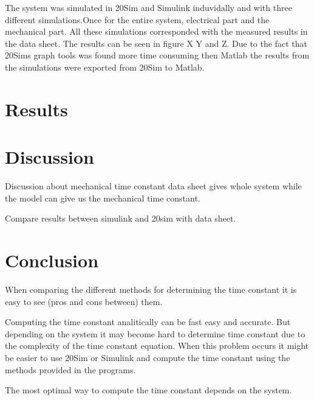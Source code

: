 \documentclass[12pt,a4paper]{article}
\begin{document}
The system was simulated in 20Sim and Simulink induvidally and with three different simulations.Once for the entire system, electrical part and the mechanical part. All these simulations corresponded with the measured results in the data sheet. The results can be seen in figure X Y and Z. Due to the fact that 20Sims graph tools was found more time consuming then Matlab the results from the simulations were exported from 20Sim to Matlab.
\section{Results}


\section{Discussion}
Discussion about mechanical time constant data sheet gives whole system while the model can give us the mechanical time constant.

Compare results between simulink and 20sim with data sheet.
\lipsum[4]

\section{Conclusion}
When comparing the different methods for determining the time constant it is easy to see (pros and cons between) them. 

Computing the time constant analitically can be fast easy and accurate. But depending on the system it may become hard to determine time constant due to the complexity of the time constant equation. When this problem occurs it might be easier to use 20Sim or Simulink and compute the time constant using the methods provided in the programs.

The most optimal way to compute the time constant depends on the system.

\begin{thebibliography}{99}

\end{thebibliography}
\end{document}
